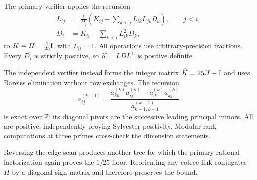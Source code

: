 The primary verifier applies the recursion
\begin{align*}
 L_{ij}&=\frac{1}{D_j}\left(K_{ij}-\sum_{k<j}L_{ik}L_{jk}D_k\right),
 \qquad j<i,\\
 D_i&=K_{ii}-\sum_{k<i}L_{ik}^2D_k,
\end{align*}
to $K=H-\frac1{25}\mathrm I$, with $L_{ii}=1$.  All operations use
arbitrary-precision fractions.  Every $D_i$ is strictly positive, so
$K=LDL^{\mathsf T}$ is positive definite.

The independent verifier instead forms the integer matrix $\widehat K=25H-
\mathrm I$ and uses Bareiss elimination without row exchanges.  The recursion
\[
 a_{ij}^{(k+1)}=
 \frac{a_{kk}^{(k)}a_{ij}^{(k)}-a_{ik}^{(k)}a_{kj}^{(k)}}
      {a_{k-1,k-1}^{(k-1)}}
\]
is exact over $\mathbb Z$; its diagonal pivots are the successive leading
principal minors.  All are positive, independently proving Sylvester
positivity.  Modular rank computations at three primes cross-check the
dimension statements.

Reversing the edge scan produces another tree for which the primary rational
factorization again proves the $1/25$ floor.  Reorienting any cotree link
conjugates $H$ by a diagonal sign matrix and therefore preserves the bound.
